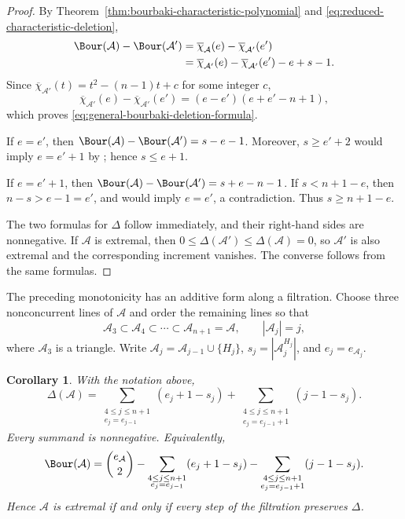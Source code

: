 \documentclass[11pt]{amsart}   %
\newtheorem{Corollary}[Theorem]{Corollary}
\theoremstyle{definition}
\def\A{{\mathcal A}}
\begin{document}
\begin{proof}
By Theorem~\ref{thm:bourbaki-characteristic-polynomial} and \eqref{eq:reduced-characteristic-deletion},
\[
\begin{aligned}
\Bour(\A)-\Bour(\A')
&=
\overline{\chi}_\A(e)-\overline{\chi}_{\A'}(e')\\
&=
\overline{\chi}_{\A'}(e)-\overline{\chi}_{\A'}(e')-e+s-1.
\end{aligned}
\]
Since $\overline{\chi}_{\A'}(t)=t^2-(n-1)t+c$ for some integer $c$,
\[
\overline{\chi}_{\A'}(e)-\overline{\chi}_{\A'}(e')
=
(e-e')(e+e'-n+1),
\]
which proves \eqref{eq:general-bourbaki-deletion-formula}.

If $e=e'$, then $\Bour(\A)-\Bour(\A')=s-e-1$. Moreover, $s\geq e'+2$ would imply $e=e'+1$ by \cite[Theorem~3.3]{Abe-Dimca-Stic}; hence $s\leq e+1$.

If $e=e'+1$, then $\Bour(\A)-\Bour(\A')=s+e-n-1$. If $s<n+1-e$, then $n-s>e-1=e'$, and \cite[Proposition~2.12(3)]{Abe-Dimca-Stic} would imply $e=e'$, a contradiction. Thus $s\geq n+1-e$.

The two formulas for $\Delta$ follow immediately, and their right-hand sides are nonnegative. If $\A$ is extremal, then $0\leq\Delta(\A')\leq\Delta(\A)=0$, so $\A'$ is also extremal and the corresponding increment vanishes. The converse follows from the same formulas.
\end{proof}

The preceding monotonicity has an additive form along a filtration. Choose three nonconcurrent lines of $\A$ and order the remaining lines so that
\[
\A_3\subset\A_4\subset\cdots\subset\A_{n+1}=\A,
\qquad |\A_j|=j,
\]
where $\A_3$ is a triangle. Write $\A_j=\A_{j-1}\cup\{H_j\}$, $s_j=|\A_j^{H_j}|$, and $e_j=e_{\A_j}$.

\begin{Corollary}
\label{cor:triangular-defect-filtration}
With the notation above,
\[
\Delta(\A)
=
\sum_{\substack{4\leq j\leq n+1\\ e_j=e_{j-1}}}
(e_j+1-s_j) +
\sum_{\substack{4\leq j\leq n+1\\ e_j=e_{j-1}+1}}
(j-1-s_j).
\]
Every summand is nonnegative. Equivalently,
\[
\Bour(\A)
=
\binom{e_\A}{2}
-
\sum_{\substack{4\leq j\leq n+1\\ e_j=e_{j-1}}}
(e_j+1-s_j) -
\sum_{\substack{4\leq j\leq n+1\\ e_j=e_{j-1}+1}}
(j-1-s_j).
\]
Hence $\A$ is extremal if and only if every step of the filtration preserves $\Delta$.
\end{Corollary}
\end{document}
